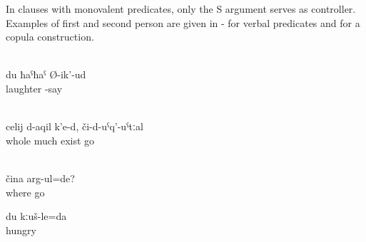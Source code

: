 In clauses with monovalent predicates, only the S argument serves as controller. Examples of first and second person are given in - for verbal predicates and  for a copula construction.
%
\begin{exe}
		\\	\label{ex:I (masc.) laugh habitual present}
		\gll	du 	ħaˁħaˁ 		Ø-ik'-ud\\
			 	laughter	-say\\
		\glt	{}

		\\	\label{ex:There is much there, if you go there realis conditional}
		\gll	celij 	d-aqil	k'e-d,	či-d-uˁq'-uˁtːal\\
			whole	much	exist	go\\
		\glt	{}

		\\	\label{ex:Where are you going compound present}
		\gll	čina	arg-ul=de?\\
			where	go\\
		\glt	{}

	\ex	\label{ex:I am hungry agreement rules}
	\gll	du	kːuš-le=da\\
			hungry\\
	\glt	{}
\end{exe}

